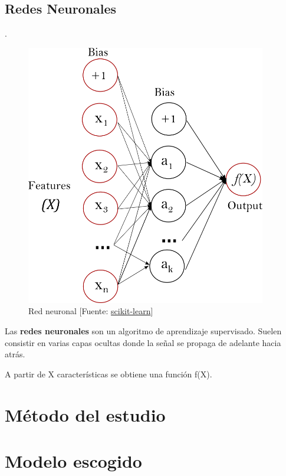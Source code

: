 	\subsection{Redes Neuronales}
	\label{makereference4.3.3}
	.
	\begin{figure}[htb]
		
		\begin{center}
			\includegraphics[height=4.5in]{figures/neuronal_network.png}
			\caption{Red neuronal [Fuente: \href{www.scikit-learn.org}{scikit-learn}]}
		\end{center}
		
		\label{network}
	\end{figure}

	Las \textbf{redes neuronales} son un algoritmo de aprendizaje supervisado. Suelen consistir en varias capas ocultas donde la señal se propaga de adelante hacia atrás.
	
	A partir de X características se obtiene una función f(X).
	
\section{Método del estudio}
\label{makereference4.4}

\section{Modelo escogido}
\label{makereference4.5}
